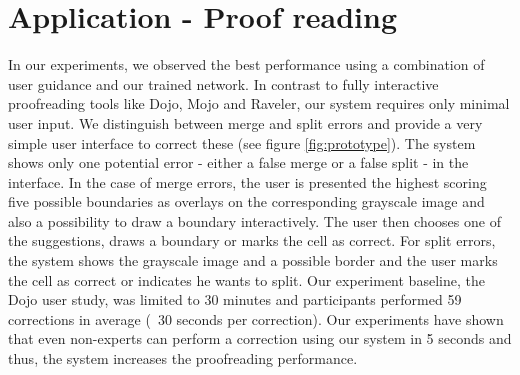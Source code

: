 \section{Application - Proof reading}

In our experiments, we observed the best performance using a combination of user guidance and our trained network. In contrast to fully interactive proofreading tools like Dojo, Mojo and Raveler, our system requires only minimal user input. We distinguish between merge and split errors and provide a very simple user interface to correct these (see figure \ref{fig:prototype}).
The system shows only one potential error - either a false merge or a false split - in the interface. In the case of merge errors, the user is presented the highest scoring five possible boundaries as overlays on the corresponding grayscale image and also a possibility to draw a boundary interactively. The user then chooses one of the suggestions, draws a boundary or marks the cell as correct.  For split errors, the system shows the grayscale image and a possible border and the user marks the cell as correct or indicates he wants to split. Our experiment baseline, the Dojo user study, was limited to 30 minutes and participants performed 59 corrections in average (~30 seconds per correction). Our experiments have shown that even non-experts can perform a correction using our system in 5 seconds and thus, the system increases the proofreading performance.
